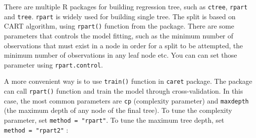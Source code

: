 \documentclass[12pt,]{krantz}
\makeatletter
\newenvironment{Shaded}{\begin{snugshade}}{\end{snugshade}}
\newcommand{\CommentTok}[1]{\textcolor[rgb]{0.37,0.37,0.37}{\textit{#1}}}
\newcommand{\DataTypeTok}[1]{\textcolor[rgb]{0.27,0.27,0.27}{#1}}
\newcommand{\DecValTok}[1]{\textcolor[rgb]{0.06,0.06,0.06}{#1}}
\newcommand{\KeywordTok}[1]{\textcolor[rgb]{0.27,0.27,0.27}{\textbf{#1}}}
\newcommand{\NormalTok}[1]{#1}
\newcommand{\OperatorTok}[1]{\textcolor[rgb]{0.43,0.43,0.43}{\textbf{#1}}}
\newcommand{\StringTok}[1]{\textcolor[rgb]{0.5,0.5,0.5}{#1}}
\newenvironment{kframe}{%
\medskip{}
\setlength{\fboxsep}{.8em}
 \def\at@end@of@kframe{}%
 \ifinner\ifhmode%
  \def\at@end@of@kframe{\end{minipage}}%
  \begin{minipage}{\columnwidth}%
 \fi\fi%
 \def\FrameCommand##1{\hskip\@totalleftmargin \hskip-\fboxsep
 \colorbox{shadecolor}{##1}\hskip-\fboxsep
     \hskip-\linewidth \hskip-\@totalleftmargin \hskip\columnwidth}%
 \MakeFramed {\advance\hsize-\width
   \@totalleftmargin\z@ \linewidth\hsize
   \@setminipage}}%
 {\par\unskip\endMakeFramed%
 \at@end@of@kframe}
\renewenvironment{Shaded}{\begin{kframe}}{\end{kframe}}
\makeatother
\begin{document}
There are multiple R packages for building regression tree, such as \texttt{ctree}, \texttt{rpart} and \texttt{tree}. \texttt{rpart} is widely used for building single tree. The split is based on CART algorithm, using \texttt{rpart()} function from the package. There are some parameters that controls the model fitting, such as the minimum number of observations that must exist in a node in order for a split to be attempted, the minimum number of observations in any leaf node etc. You can can set those parameter using \texttt{rpart.control}.

A more convenient way is to use \texttt{train()} function in \texttt{caret} package. The package can call \texttt{rpart()} function and train the model through cross-validation. In this case, the most common parameters are \texttt{cp} (complexity parameter) and \texttt{maxdepth} (the maximum depth of any node of the final tree). To tune the complexity parameter, set \texttt{method\ =\ "rpart"}. To tune the maximum tree depth, set \texttt{method\ =\ "rpart2"} :

\begin{Shaded}
\end{Shaded}
\end{document}
